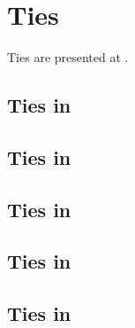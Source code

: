 



\chapter{Ties}

Ties are presented at .


\section{Ties in \mxsrToMsr{}}


\section{Ties in \mxsrToMsr{}}


\section{Ties in \msrToMsr{}}


\section{Ties in \msrToLpsr{}}


\section{Ties in \lpsrToLilypond{}}


